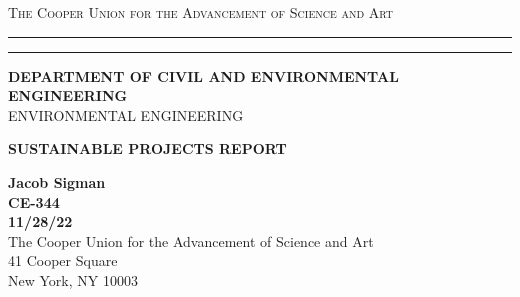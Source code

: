 \begin{titlepage}
    \begin{center}
    {{\Large{\textsc{The Cooper Union for the Advancement of Science and Art}}}} \rule[0.1cm]{15.8cm}{0.1mm}
    \rule[0.5cm]{15.8cm}{0.6mm}
    {\small{\bf DEPARTMENT OF CIVIL AND ENVIRONMENTAL ENGINEERING}}\\
    {\footnotesize{ENVIRONMENTAL ENGINEERING}}
    \end{center}
    \vspace{15mm}
    \begin{center}
    {\Large{\bf SUSTAINABLE PROJECTS REPORT\\}}
    \end{center}
    \vspace{35mm}
    \par
    \noindent
    \hfill
    \vspace{60mm}
    \begin{center}
    {\large{\bf Jacob Sigman \\ CE-344 \\ 11/28/22 \\}}
    \vspace{20mm}
    {\normalsize{The Cooper Union for the Advancement of Science and Art \\ 41 Cooper Square\\
    New York, NY 10003}}
    \end{center}
\end{titlepage}